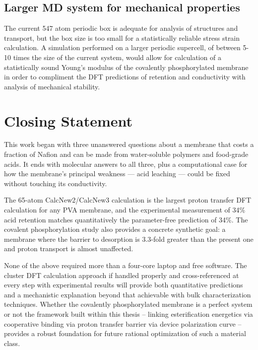 \documentclass[12pt,a4paper]{report}
\begin{document}
\subsection*{Larger MD system for mechanical properties}

The current 547 atom periodic box is adequate for analysis of structures and transport, but the box size is too small for a statistically reliable stress strain calculation. A simulation performed on a larger periodic supercell, of between 5-10 times the size of the current system, would allow for calculation of a statistically sound Young's modulus of the covalently phosphorylated membrane in order to compliment the DFT predictions of retention and conductivity with analysis of mechanical stability.



\section{Closing Statement}

This work began with three unanswered questions about a 
membrane that costs a fraction of Nafion and can be made 
from water-soluble polymers and food-grade acids. It ends 
with molecular answers to all three, plus a computational 
case for how the membrane's principal weakness — acid 
leaching — could be fixed without touching its conductivity.

The 65-atom CalcNew2/CalcNew3 calculation is the largest proton transfer DFT calculation for any PVA membrane, and the experimental measurement of 34\% acid retention matches quantitatively the parameter-free prediction of 34\%. The covalent phosphorylation study also provides a concrete synthetic goal: a membrane where the barrier to desorption is 3.3-fold greater than the present one and proton transport is almost unaffected.

None of the above required more than a four-core laptop and free software. The cluster DFT calculation approach if handled properly and cross-referenced at every step with experimental results will provide both quantitative predictions and a mechanistic explanation beyond that achievable with bulk characterization techniques. Whether the covalently phosphorylated membrane is a perfect system or not the framework built within this thesis – linking esterification energetics via cooperative binding via proton transfer barrier via device polarization curve – provides a robust foundation for future rational optimization of such a material class.
\end{document}
